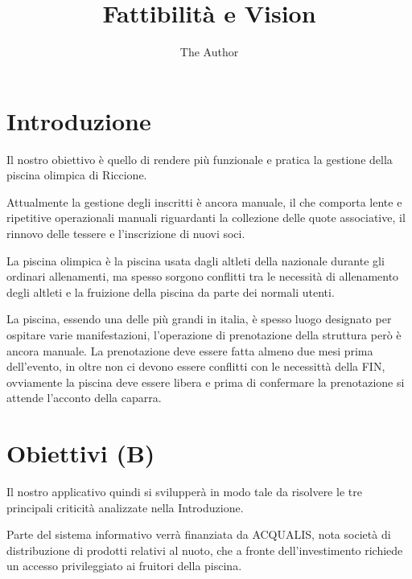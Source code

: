 \documentclass[11pt]{article} %
\title{Fattibilità e Vision}
\author{The Author}
\begin{document}
\maketitle

\section{Introduzione}

Il nostro obiettivo è quello di rendere più funzionale e pratica la gestione della piscina olimpica di Riccione.

Attualmente la gestione degli inscritti è ancora manuale, il che comporta lente e ripetitive operazionali manuali riguardanti la collezione delle quote associative, il rinnovo delle tessere e l'inscrizione di nuovi soci.

La piscina olimpica è la piscina usata dagli altleti della nazionale durante gli ordinari allenamenti, ma spesso sorgono conflitti tra le necessità di allenamento degli altleti e la fruizione della piscina da parte dei normali utenti.

La piscina, essendo una delle più grandi in italia, è spesso luogo designato per ospitare varie manifestazioni, l'operazione di prenotazione della struttura però è ancora manuale. 
La prenotazione deve essere fatta almeno due mesi prima dell'evento, in oltre non ci devono essere conflitti con le necessittà della FIN, ovviamente la piscina deve essere libera e prima di confermare la prenotazione si attende l'acconto della caparra.



\section{Obiettivi (B)}

Il nostro applicativo quindi si svilupperà in modo tale da risolvere le tre principali criticità analizzate nella Introduzione.

Parte del sistema informativo verrà finanziata da ACQUALIS, nota società di distribuzione di prodotti relativi al nuoto, che a fronte dell'investimento richiede un accesso privileggiato ai fruitori della piscina.
\end{document}

